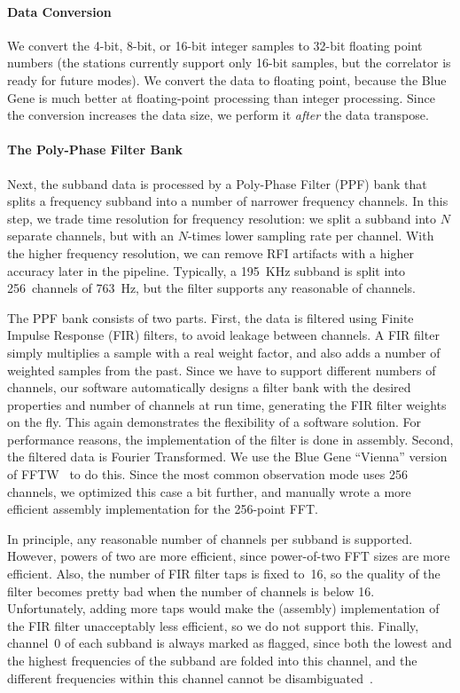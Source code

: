 \paragraph{Data Conversion}
We convert the 4-bit, 8-bit, or 16-bit integer samples to 32-bit
floating point numbers (the stations currently support only 16-bit samples,
but the correlator is ready for future modes).
We convert the data to floating point, because the Blue Gene is much better at
floating-point processing than integer processing.
Since the conversion increases the data size, we perform it \emph{after\/} the
data transpose.


\paragraph{The Poly-Phase Filter Bank }
Next, the subband data is processed by a Poly-Phase Filter (PPF) bank that
splits a frequency subband into a number of narrower frequency channels.
In this step, we trade time resolution for frequency resolution: we split a
subband into $N$ separate channels, but with an $N$-times lower sampling rate
per channel.
With the higher frequency resolution, we can remove RFI artifacts with a
higher accuracy later in the pipeline.
Typically, a 195~KHz subband is split into 256~channels of 763~Hz, but the
filter supports any reasonable of channels.

The PPF bank consists of two parts.
First, the data is filtered using Finite Impulse Response (FIR) filters,
to avoid leakage between channels.
A FIR filter simply multiplies a sample with a real weight factor, and
also adds a number of weighted samples from the past.
Since we have to support different numbers of channels, our software
automatically designs a filter bank with the desired properties and number
of channels at run time, generating the FIR filter weights on the fly.
This again demonstrates the flexibility of a software solution.
For performance reasons, the implementation of the filter is done in assembly.
Second, the filtered data is Fourier Transformed.
We use the Blue Gene ``Vienna'' version of FFTW~\cite{Lorenz:05} to do this.
Since the most common observation mode uses 256 channels, we optimized this
case a bit further, and manually wrote a more efficient assembly
implementation for the 256-point FFT.

In principle, any reasonable number of channels per subband is supported.
However, powers of two are more efficient, since power-of-two FFT sizes
are more efficient.
Also, the number of FIR filter taps is fixed to~16, so the quality of the
filter becomes pretty bad when the number of channels is below 16.
Unfortunately, adding more taps would make the (assembly) implementation
of the FIR filter unacceptably less efficient, so we do not support this.
Finally, channel~0 of each subband is always marked as flagged, since both
the lowest and the highest frequencies of the subband are folded into this
channel, and the different frequencies within this channel cannot be
disambiguated~\cite{Romein:08}.


